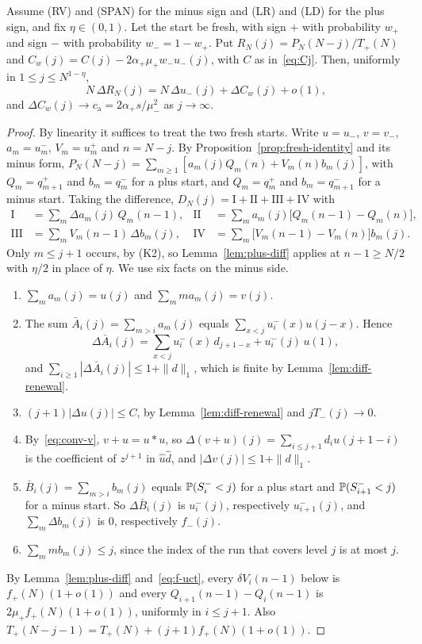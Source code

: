 \begin{theorem}\label{thm:first-diff}
Assume (RV) and (SPAN) for the minus sign and (LR) and (LD) for the plus sign, and fix
$\eta\in(0,1)$. Let the start be fresh, with sign $\plus$ with probability $w_\plus$ and sign
$\minus$ with probability $w_\minus=1-w_\plus$. Put $R_N(j)=P_N(N-j)/T_\plus(N)$ and
$C_w(j)=C(j)-2\alpha_\plus\mu_\plus w_\minus u_\minus(j)$, with $C$ as in~\eqref{eq:Cj}. Then,
uniformly in $1\le j\le N^{1-\eta}$,
\[
 N\,\Delta R_N(j)=N\,\Delta u_\minus(j)+\Delta C_w(j)+o(1),
\]
and $\Delta C_w(j)\to c_{\mathrm a}=2\alpha_\plus s/\mu_\minus^2$ as $j\to\infty$.
\end{theorem}

\begin{proof}
By linearity it suffices to treat the two fresh starts. Write $u=u_\minus$, $v=v_\minus$,
$a_m=u^\minus_m$, $V_m=u^\plus_m$ and $n=N-j$. By Proposition~\ref{prop:fresh-identity} and its
minus form, $P_N(N-j)=\sum_{m\ge1}[a_m(j)Q_m(n)+V_m(n)b_m(j)]$, with $Q_m=q^\plus_{m+1}$ and
$b_m=q^\minus_m$ for a plus start, and $Q_m=q^\plus_m$ and $b_m=q^\minus_{m+1}$ for a minus
start. Taking the difference,
$D_N(j)=\mathrm I+\mathrm{II}+\mathrm{III}+\mathrm{IV}$ with
\begin{align*}
 \mathrm I&=\sum_m\Delta a_m(j)\,Q_m(n-1),&
 \mathrm{II}&=\sum_ma_m(j)\bigl[Q_m(n-1)-Q_m(n)\bigr],\\
 \mathrm{III}&=\sum_mV_m(n-1)\,\Delta b_m(j),&
 \mathrm{IV}&=\sum_m\bigl[V_m(n-1)-V_m(n)\bigr]b_m(j).
\end{align*}
Only $m\le j+1$ occurs, by (K2), so Lemma~\ref{lem:plus-diff} applies at $n-1\ge N/2$ with
$\eta/2$ in place of $\eta$. We use six facts on the minus side.
\begin{enumerate}[(1)]
\item $\sum_ma_m(j)=u(j)$ and $\sum_mma_m(j)=v(j)$.
\item The sum $\bar A_i(j)=\sum_{m>i}a_m(j)$ equals $\sum_{x<j}u^\minus_i(x)u(j-x)$. Hence
\[
 \Delta\bar A_i(j)=\sum_{x<j}u^\minus_i(x)\,d_{j+1-x}+u^\minus_i(j)\,u(1),
\]
and $\sum_{i\ge1}|\Delta\bar A_i(j)|\le1+\|d\|_1$, which is finite by
Lemma~\ref{lem:diff-renewal}.
\item $(j+1)|\Delta u(j)|\le C$, by Lemma~\ref{lem:diff-renewal} and $jT_\minus(j)\to0$.
\item By~\eqref{eq:conv-v}, $v+u=u*u$, so $\Delta(v+u)(j)=\sum_{i\le j+1}d_iu(j+1-i)$ is the
coefficient of $z^{j+1}$ in $\hat u\hat d$, and $|\Delta v(j)|\le1+\|d\|_1$.
\item $\bar B_i(j)=\sum_{m>i}b_m(j)$ equals $\mathbb{P}(S^{-}_i<j)$ for a plus start and
$\mathbb{P}(S^{-}_{i+1}<j)$ for a minus start. So $\Delta\bar B_i(j)$ is $u^\minus_i(j)$,
respectively $u^\minus_{i+1}(j)$, and $\sum_m\Delta b_m(j)$ is $0$, respectively
$f_\minus(j)$.
\item $\sum_mmb_m(j)\le j$, since the index of the run that covers level $j$ is at most $j$.
\end{enumerate}
By Lemma~\ref{lem:plus-diff} and~\eqref{eq:f-uct}, every $\delta V_i(n-1)$ below is
$f_\plus(N)(1+o(1))$ and every $Q_{i+1}(n-1)-Q_i(n-1)$ is $2\mu_\plus f_\plus(N)(1+o(1))$,
uniformly in $i\le j+1$. Also $T_\plus(N-j-1)=T_\plus(N)+(j+1)f_\plus(N)(1+o(1))$.


\end{proof}
